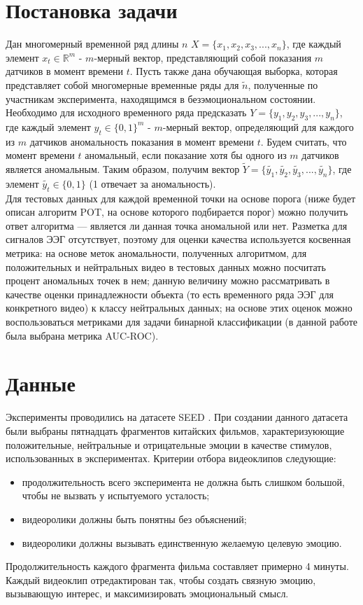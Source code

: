\documentclass{article}
\begin{document}
\section{Постановка задачи}
Дан многомерный временной ряд длины $n$ $X = \{x_1, x_2, x_3, ..., x_n\}$, где каждый элемент $x_t \in \mathbb{R}^{m}$ - $m$-мерный вектор, представляющий собой показания $m$ датчиков в момент времени $t$. Пусть также дана обучающая выборка, которая представляет собой многомерные временные ряды для $\widetilde{n}$, полученные по участникам эксперимента, находящимся в безэмоциональном состоянии. Необходимо для исходного временного ряда предсказать $Y = \{y_1, y_2, y_3, ..., y_n\}$, где каждый элемент $y_t \in \{0, 1\}^{m}$ - $m$-мерный вектор, определяющий для каждого из $m$ датчиков аномальность показания в момент времени $t$. Будем считать, что момент времени $t$ аномальный, если показание хотя бы одного из $m$ датчиков является аномальным. Таким образом, получим вектор $\widetilde{Y} = \{\widetilde{y_1}, \widetilde{y_2}, \widetilde{y_3}, ..., \widetilde{y_n}\}$, где элемент $\widetilde{y_t} \in \{0, 1\}$ (1 отвечает за аномальность). \\
Для тестовых данных для каждой временной точки на основе порога (ниже будет описан алгоритм POT, на основе которого подбирается порог) можно получить ответ алгоритма --- является ли данная точка аномальной или нет. Разметка для сигналов ЭЭГ отсутствует, поэтому для оценки качества используется косвенная метрика: на основе меток аномальности, полученных алгоритмом, для положительных и нейтральных видео в тестовых данных можно посчитать процент аномальных точек в нем; данную величину можно рассматривать в качестве оценки принадлежности объекта (то есть временного ряда ЭЭГ для конкретного видео) к классу нейтральных данных; на основе этих оценок можно воспользоваться метриками для задачи бинарной классификации (в данной работе была выбрана метрика AUC-ROC).

\section{Данные}
Эксперименты проводились на датасете SEED \cite{seed}. При создании данного датасета были выбраны пятнадцать фрагментов китайских фильмов, характеризуюющие положительные, нейтральные и отрицательные эмоции в качестве стимулов, использованных в экспериментах. Критерии отбора видеоклипов следующие:
\begin{itemize}
    \item продолжительность всего эксперимента не должна быть слишком большой, чтобы не вызвать у испытуемого усталость;
    \item  видеоролики должны быть понятны без объяснений;
    \item видеоролики должны вызывать единственную желаемую целевую эмоцию.
\end{itemize}
Продолжительность каждого фрагмента фильма составляет примерно 4 минуты. Каждый видеоклип отредактирован так, чтобы создать связную эмоцию, вызывающую интерес, и максимизировать эмоциональный смысл. 
\end{document}
